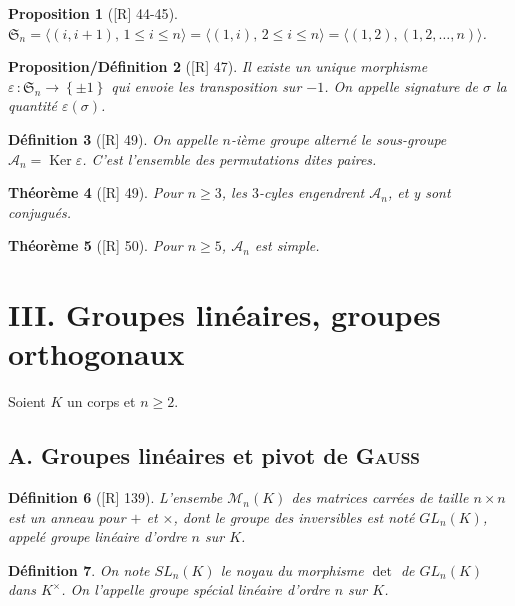 \documentclass[10pt, a4paper, parskip=full, twoside, twocolumn]{report}
\newtheorem{definition}{Définition}
\newtheorem{theorem}[definition]{Théorème}
\newtheorem{proposition}[definition]{Proposition}
\newtheorem{proposition_def}[definition]{Proposition/Définition}
\newcommand{\M}{\mathcal{M}}
\newcommand{\A}{\mathscr{A}}
\DeclareMathOperator{\Ker}{Ker}
\begin{document}
\begin{proposition}[\textnormal{[R] 44-45}]
	$\mathfrak{S}_n = \langle (i,i+1),\, 1\leq i\leq n\rangle = \langle (1,i),\,2\leq i\leq n\rangle = \langle (1,2), (1,2,\dots,n)\rangle$.
\end{proposition}

\begin{proposition_def}[\textnormal{[R] 47}]
	Il existe un unique morphisme $\varepsilon\,\colon \mathfrak{S}_n\to\left\{\pm 1\right\}$ qui envoie les transposition sur $-1$.
	On appelle \emph{signature de $\sigma$} la quantité $\varepsilon(\sigma)$.
\end{proposition_def}

\begin{definition}[\textnormal{[R] 49}]
	On appelle \emph{$n$-ième groupe alterné} le sous-groupe $\A_n =\Ker \varepsilon$. C'est l'ensemble des permutations dites \emph{paires}.
\end{definition}

\begin{theorem}[\textnormal{[R] 49}]
	Pour $n\geq 3$, les $3$-cyles engendrent $\A_n$, et y sont conjugués.
\end{theorem}

\begin{theorem}[\textnormal{[R] 50}]
	Pour $n\geq 5$, $\A_n$ est simple.
\end{theorem}

\section*{III. Groupes linéaires, groupes orthogonaux}
\textcolor{paragraphtext}{Soient $K$ un corps et $n\geq 2$.}

\subsection*{A. Groupes linéaires et pivot de \textsc{Gauss}}

\begin{definition}[\textnormal{[R] 139}]
	L'ensembe $\M_n(K)$ des matrices carrées de taille $n\times n$ est un anneau pour $+$ et $\times$, dont le groupe des inversibles est noté $GL_n(K)$, appelé \emph{groupe linéaire d'ordre $n$ sur $K$}.
\end{definition}

\begin{definition}
	On note $SL_n(K)$ le noyau du morphisme $\det$ de $GL_n(K)$ dans $K^{\times}$.
	On l'appelle \emph{groupe spécial linéaire d'ordre $n$ sur $K$}.
\end{definition}
\end{document}
